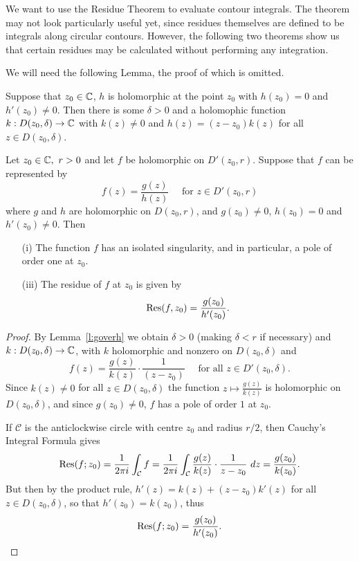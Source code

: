 We want to use the Residue Theorem to evaluate contour integrals.  The theorem may not look particularly useful yet, since residues themselves are defined to be integrals along circular contours.  However, the following two theorems show us that certain residues may be calculated without performing any integration.




We will need the following Lemma, the proof of which is omitted.
\begin{lemma}
\label{l:goverh}
Suppose that $z_0 \in \mathbb{C}$, $h$ is holomorphic at the point $z_0$ with $h(z_0)=0$ and $h'(z_0) \neq 0$.  Then there is some $\delta>0$ and a holomophic function $k:D(z_0,\delta) \to \mathbb{C}$ with $k(z) \neq 0$ and $h(z)=(z-z_0)k(z)$ for all $z \in D(z_0,\delta)$.
\end{lemma}
\begin{theorem}
\label{t:goverh}
Let $z_0 \in \mathbb{C},\ r>0$ and let $f$ be holomorphic on $D'(z_0,r)$. Suppose that $f$ can be represented by
\[
f(z) = \frac{g(z)}{h(z)}\quad \text{ for } z \in D'(z_0,r)
\]
where $g$ and $h$ are holomorphic on $D(z_0,r)$, and $g(z_0) \neq 0$, $h(z_0)=0$ and $h'(z_0) \neq 0$. Then
\begin{enumerate}
\item[(i)] The function $f$ has an isolated singularity, and in particular, a  pole of order one at $z_0$.
\item[(iii)] The residue of $f$ at $z_0$ is given by
\[
\mathrm{Res} (f,z_0) = \frac{g(z_0)}{h'(z_0)}.
\]
\end{enumerate}
\end{theorem}
\begin{proof}
By Lemma~\ref{l:goverh} we obtain $\delta>0$ (making $\delta<r$ if necessary) and $k:D(z_0,\delta)\to \mathbb{C}$, with $k$ holomorphic and nonzero on $D(z_0,\delta)$ and
\[
f(z)= \frac{g(z)}{k(z)}\cdot \frac{1}{(z-z_0)} \quad \text{ for all } z \in D'(z_0,\delta).
\]
Since $k(z) \neq 0$ for all $z \in D(z_0,\delta)$ the function $z \mapsto \frac{g(z)}{k(z)}$ is holomorphic on $D(z_0,\delta)$, and since $g(z_0) \neq 0$, $f$ has a pole of order $1$ at $z_0$.

If $\mathcal{C}$ is the anticlockwise circle with centre $z_0$ and radius $r/2$, then Cauchy's Integral Formula gives
\[
\mathrm{Res} (f;z_0) = \frac{1}{2\pi i} \int_{\mathcal{C}} f = \frac{1}{2\pi i} \int_{\mathcal{C}} \frac{g(z)}{k(z)} \cdot \frac{1}{z-z_0}\ dz = \frac{g(z_0)}{k(z_0)}.
\]
But then by the product rule, $h'(z) = k(z)+(z-z_0)k'(z)$ for all $z \in D(z_0,\delta)$, so that $h'(z_0) = k(z_0)$, thus
\[
\mathrm{Res} (f;z_0) = \frac{g(z_0)}{h'(z_0)}.
\]
\end{proof}



